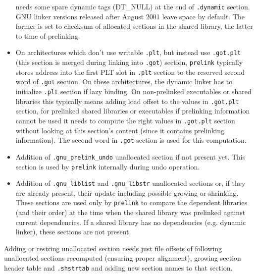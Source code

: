 \documentclass[twoside]{article}
\def\tts#1{\texttt{\small #1}}
\begin{document}
\begin{itemize}
{needs some spare dynamic tags (DT\_NULL) at the end of \tts{.dynamic}
section.  GNU linker versions released after August 2001 leave space by
default.}  The former is set to checksum of allocated sections in the
shared library, the latter to time of prelinking.
\item On architectures which don't use writable \tts{.plt}, but instead use
\tts{.got.plt} (this section is merged during linking into \tts{.got})
section, \tts{prelink} typically stores address into the first PLT slot
in \tts{.plt} section to the reserved second word of \tts{.got} section.
On these architectures, the dynamic linker has to initialize \tts{.plt}
section if lazy binding.  On non-prelinked executables or shared libraries
this typically means adding load offset to the values in \tts{.got.plt}
section,  for prelinked shared libraries or executables if prelinking
information cannot be used it needs to compute the right values in
\tts{.got.plt} section without looking at this section's content
(since it contains prelinking information).  The second word in \tts{.got}
section is used for this computation.
\item Addition of \tts{.gnu\_prelink\_undo} unallocated section if not
present yet.  This section is used by \tts{prelink} internally during
undo operation.
\item Addition of \tts{.gnu\_liblist} and \tts{.gnu\_libstr} unallocated
sections or, if they are already present, their update including possible
growing or shrinking.  These sections are used only by \tts{prelink} to
compare the dependent libraries (and their order) at the time when the
shared library was prelinked against current dependencies.  If a shared
library has no dependencies (e.g. dynamic linker), these sections are not
present.
\end{itemize}

Adding or resizing unallocated section needs just file offsets of following
unallocated sections recomputed (ensuring proper alignment), growing section
header table and \tts{.shstrtab} and adding new section names to that section.
\end{document}
